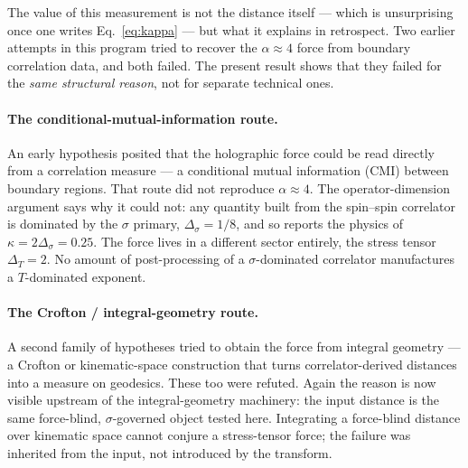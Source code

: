 \documentclass[11pt]{article}
\begin{document}
The value of this measurement is not the distance itself --- which is unsurprising once one
writes Eq.~\eqref{eq:kappa} --- but what it explains in retrospect. Two earlier attempts in
this program tried to recover the $\alpha\approx4$ force from boundary correlation data, and
both failed. The present result shows that they failed for the \emph{same structural reason},
not for separate technical ones.

\paragraph{The conditional-mutual-information route.}
An early hypothesis posited that the holographic force could be read directly from a
correlation measure --- a conditional mutual information (CMI) between boundary regions. That
route did not reproduce $\alpha\approx4$. The operator-dimension argument says why it could
not: any quantity built from the spin--spin correlator is dominated by the $\sigma$ primary,
$\Delta_\sigma=1/8$, and so reports the physics of $\kappa=2\Delta_\sigma=0.25$. The force
lives in a different sector entirely, the stress tensor $\Delta_T=2$. No amount of
post-processing of a $\sigma$-dominated correlator manufactures a $T$-dominated exponent.

\paragraph{The Crofton / integral-geometry route.}
A second family of hypotheses tried to obtain the force from integral geometry --- a Crofton
or kinematic-space construction that turns correlator-derived distances into a measure on
geodesics. These too were refuted. Again the reason is now visible upstream of the
integral-geometry machinery: the input distance is the same force-blind, $\sigma$-governed
object tested here. Integrating a force-blind distance over kinematic space cannot conjure a
stress-tensor force; the failure was inherited from the input, not introduced by the
transform.
\end{document}
